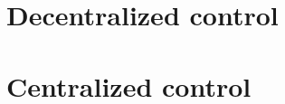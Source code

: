 \documentclass[12pt, a4paper]{article}
\begin{document}
\maketitle
\section{Decentralized control}

\newpage

\newpage

\newpage

\newpage

\newpage

\newpage


\newpage
\section{Centralized control}

\newpage

\newpage

\newpage

\newpage

\newpage

\newpage

\newpage

\end{document}
